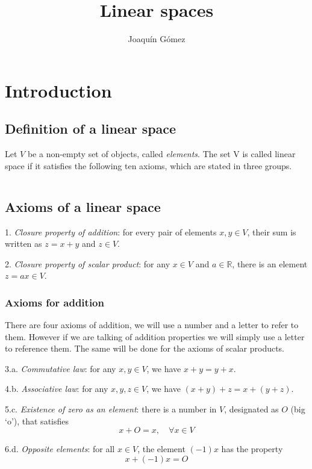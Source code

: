 \documentclass{report}
\title{Linear spaces}
\author{Joaquín Gómez}
\begin{document}
\maketitle

\chapter{Introduction}
\section{Definition of a linear space}
Let $V$ be a non-empty set of objects, called \textit{elements}. The set V is
called linear space if it satisfies the following ten axioms, which are stated
in three groups.

\(\)

\section*{Axioms of a linear space}

\begin{list}{Axiom}{}
    \item 1.\textit{ Closure property of addition}: for every pair of elements $x,y\in V$, their sum is written as $z=x+y$ and $z\in V$.
    \item 2.\textit{ Closure property of scalar product}: for any $x\in V$ and $a\in\mathbb R$, there is an element $z=ax\in V$.
\end{list}

\subsection*{Axioms for addition}

There are four axioms of addition, we will use a number and a letter to refer
to them. However if we are talking of addition properties we will simply use a
letter to reference them. The same will be done for the axioms of scalar
products.

\begin{list}{Axiom}{}
    \item 3.a.\textit{ Commutative law}: for any $x,y\in V$, we have $x+y = y+x$.
    \item 4.b.\textit{ Associative law}: for any $x,y,z\in V$, we have $(x+y) + z = x + (y + z)$.
    \item 5.c.\textit{ Existence of zero as an element}: there is a number in $V$, designated as $O$ (big `o'), that satisfies
          \[
              x + O = x,\quad \forall x \in V
          \]

    \item 6.d.\textit{ Opposite elements}: for all $x\in V$, the element $(-1)x$ has the property
          \[
              x + (-1)x = O
          \]
\end{list}
\end{document}
